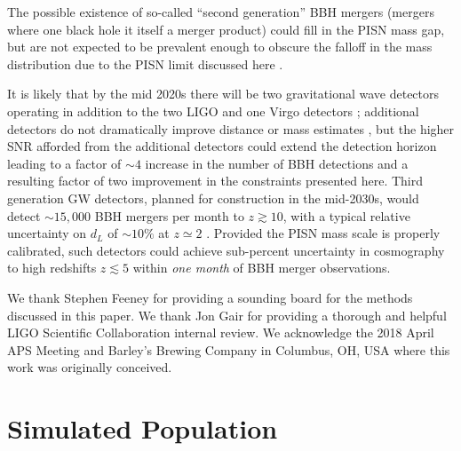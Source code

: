 \documentclass[modern]{aastex62}
\begin{document}
The possible existence of so-called ``second generation'' \ac{BBH} mergers
(mergers where one black hole it itself a merger product) could fill in the
\ac{PISN} mass gap, but are not expected to be prevalent enough to obscure the
falloff in the mass distribution due to the \ac{PISN} limit discussed here
\citep{Rodriguez2019}.

It is likely that by the mid 2020s there will be two gravitational wave
detectors operating in addition to the two LIGO and one Virgo detectors
\cite{ObsScenarios}; additional detectors do not dramatically improve distance
or mass estimates \citep{Vitale2017}, but the higher SNR afforded from the
additional detectors could extend the detection horizon leading to a factor of
$\sim 4$ increase in the number of \ac{BBH} detections and a resulting factor of
two improvement in the constraints presented here.  Third generation \ac{GW}
detectors, planned for construction in the mid-2030s, would detect $\sim 15,000$
\ac{BBH} mergers per month to $z \gtrsim 10$, with a typical relative
uncertainty on $d_L$ of $\sim 10 \%$ at $z \simeq 2$ \citep{Vitale2018}.
Provided the \ac{PISN} mass scale is properly calibrated, such detectors could
achieve sub-percent uncertainty in cosmography to high redshifts $z \lesssim 5$
within \emph{one month} of \ac{BBH} merger observations.

\acknowledgments

We thank Stephen Feeney for providing a sounding board for the methods discussed
in this paper.  We thank Jon Gair for providing a thorough and helpful LIGO
Scientific Collaboration internal review.  We acknowledge the 2018 April APS
Meeting and Barley's Brewing Company in Columbus, OH, USA where this work was
originally conceived.




\appendix

\setcounter{figure}{0}
\renewcommand{\figurename}{Extended Data Figure}
\renewcommand{\tablename}{Extended Data Table}

\section{Simulated Population}
\label{sec:simulated-population}
\end{document}
